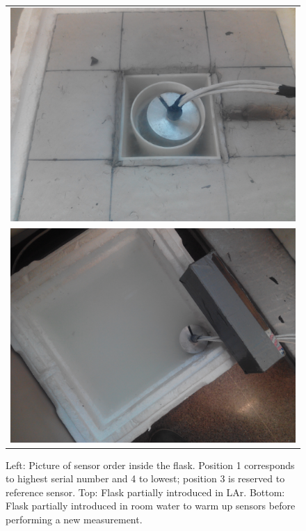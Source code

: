 \begin{figure}[htbp]
\begin{tabular}{ c }
\includegraphics[height=0.1665\textheight]{./figure_8_b.jpg} \\
\includegraphics[height=0.1665\textheight]{./figure_8_c.jpg}
\end{tabular}
\caption{Left: Picture of sensor order inside the flask. Position 1 corresponds to highest serial number and 4 to lowest; position 3 is reserved to reference sensor.
 Top: Flask partially introduced in LAr.
 Bottom: Flask partially introduced in room water to warm up sensors before performing a new measurement.
\label{fi:CAL_procedure}}
\end{figure}


